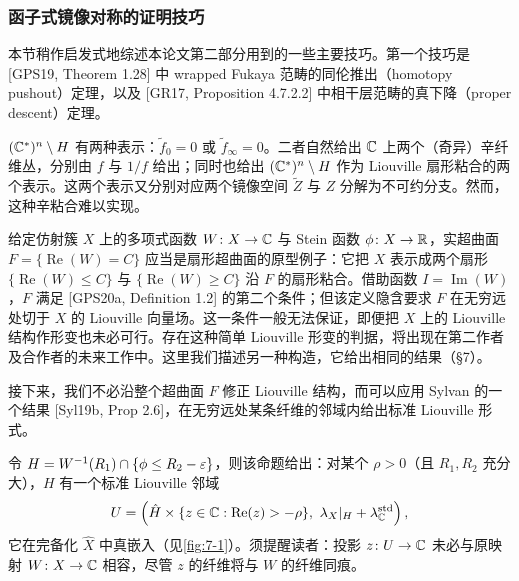 \subsubsection{函子式镜像对称的证明技巧}

本节稍作启发式地综述本论文第二部分用到的一些主要技巧。第一个技巧是 [GPS19, Theorem 1.28] 中 wrapped Fukaya 范畴的同伦推出（homotopy pushout）定理，以及 [GR17, Proposition 4.7.2.2] 中相干层范畴的真下降（proper descent）定理。

$(\mathbb{C}^*)^n\setminus H$ 有两种表示：$\tilde f_0=0$ 或 $\tilde f_\infty=0$。二者自然给出 $\mathbb{C}$ 上两个（奇异）辛纤维丛，分别由 $f$ 与 $1/f$ 给出；同时也给出 $(\mathbb{C}^*)^n\setminus H$ 作为 Liouville 扇形粘合的两个表示。这两个表示又分别对应两个镜像空间 $\tilde Z$ 与 $Z$ 分解为不可约分支。然而，这种辛粘合难以实现。



给定仿射簇 $X$ 上的多项式函数 $W\colon X\to\mathbb{C}$ 与 Stein 函数 $\phi\colon X\to\mathbb{R}$，实超曲面 $F=\{\operatorname{Re}(W)=C\}$ 应当是扇形超曲面的原型例子：它把 $X$ 表示成两个扇形 $\{\operatorname{Re}(W)\le C\}$ 与 $\{\operatorname{Re}(W)\ge C\}$ 沿 $F$ 的扇形粘合。借助函数 $I=\operatorname{Im}(W)$，$F$ 满足 [GPS20a, Definition 1.2] 的第二个条件；但该定义隐含要求 $F$ 在无穷远处切于 $X$ 的 Liouville 向量场。这一条件一般无法保证，即便把 $X$ 上的 Liouville 结构作形变也未必可行。存在这种简单 Liouville 形变的判据，将出现在第二作者及合作者的未来工作中。这里我们描述另一种构造，它给出相同的结果（§7）。


接下来，我们不必沿整个超曲面 $F$ 修正 Liouville 结构，而可以应用 Sylvan 的一个结果 [Syl19b, Prop 2.6]，在无穷远处某条纤维的邻域内给出标准 Liouville 形式。

令 $H=W^{-1}(R_1)\cap\{\phi\le R_2-\varepsilon\}$，则该命题给出：对某个 $\rho>0$（且 $R_1,R_2$ 充分大），$H$ 有一个标准 Liouville 邻域
\[
U=\left(\hat H\times\{z\in\C:\operatorname{Re}(z)>-\rho\},\ \lambda_X|_H+\lambda_\C^{\operatorname{std}}\right),
\]
它在完备化 $\hat X$ 中真嵌入（见\ref{fig:7-1}）。须提醒读者：投影 $z\colon U\to\mathbb{C}$ 未必与原映射 $W\colon X\to\mathbb{C}$ 相容，尽管 $z$ 的纤维将与 $W$ 的纤维同痕。

